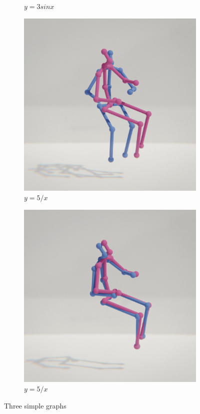 \begin{figure}
\begin{subfigure}[b]{0.25\textwidth}
        \caption{$y=3sinx$}
        \label{fig:three sin x}
    \end{subfigure}
    \hfill
    \begin{subfigure}[b]{0.25\textwidth}
        \centering
        \includegraphics[width=\textwidth]{figures/h36_viz/proc_pos.png}
        \caption{$y=5/x$}
        \label{fig:five over x}
    \end{subfigure}
    \hfill
    \begin{subfigure}[b]{0.25\textwidth}
        \centering
        \includegraphics[width=\textwidth]{figures/h36_viz/proc_rot.png}
        \caption{$y=5/x$}
        \label{fig:five over x}
    \end{subfigure}
    \caption{Three simple graphs}
    \label{fig:procrustes}
\end{figure}

